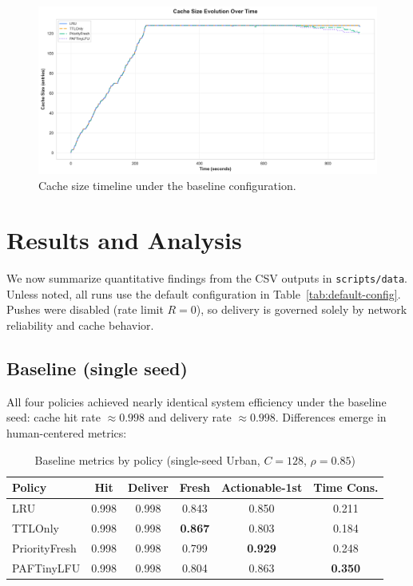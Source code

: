 \documentclass[11pt,twocolumn]{article}
\begin{document}
\begin{figure}[h]
    \centering
    \includegraphics[width=\linewidth]{figures/timeline_cache_size_timeline.png}
    \caption{Cache size timeline under the baseline configuration.}
    \label{fig:timeline-cache-size}
\end{figure}

\vspace{0.2cm}
\vspace{0.2cm}

\section{Results and Analysis}
We now summarize quantitative findings from the CSV outputs in \texttt{scripts/data}. Unless noted, all runs use the default configuration in Table~\ref{tab:default-config}. Pushes were disabled (rate limit $R{=}0$), so delivery is governed solely by network reliability and cache behavior.

\subsection{Baseline (single seed)}
All four policies achieved nearly identical system efficiency under the baseline seed: cache hit rate $\approx 0.998$ and delivery rate $\approx 0.998$. Differences emerge in human-centered metrics:

\begin{table}[h]
\centering
\caption{Baseline metrics by policy (single-seed Urban, $C{=}128$, $\rho{=}0.85$)}
\label{tab:baseline-metrics}
\begin{tabular}{@{}lccccc@{}}
    \toprule
Policy & Hit & Deliver & Fresh & Actionable-1st & Time Cons. \\
\midrule
LRU & 0.998 & 0.998 & 0.843 & 0.850 & 0.211 \\
TTLOnly & 0.998 & 0.998 & \textbf{0.867} & 0.803 & 0.184 \\
PriorityFresh & 0.998 & 0.998 & 0.799 & \textbf{0.929} & 0.248 \\
PAFTinyLFU & 0.998 & 0.998 & 0.804 & 0.863 & \textbf{0.350} \\
\bottomrule
\end{tabular}
\end{table}
\end{document}
